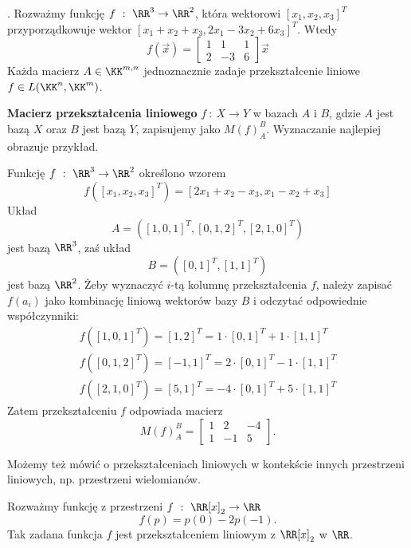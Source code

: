 . Rozważmy funkcję $f \ : \ \RR^3 \to \RR^2$, która wektorowi $[x_1,x_2,x_3]^T$ przyporządkowuje wektor $[x_1+x_2+x_3,2x_1-3x_2+6x_3]^T$. Wtedy
$$
f(\vec{x})=\begin{bmatrix}
    1 & 1 & 1 \\
    2 & -3 & 6
\end{bmatrix}\vec{x}
$$
Każda macierz $A\in\KK^{m,n}$ jednoznacznie zadaje przekształcenie liniowe $f\in L(\KK^n, \KK^m)$.
\bigskip

\textbf{Macierz przekształcenia liniowego} $f \ : \ X \to Y$ w bazach $A$ i $B$, gdzie $A$ jest bazą $X$ oraz $B$ jest bazą $Y$, zapisujemy jako $M(f)_A^B$. Wyznaczanie najlepiej obrazuje przykład.

\begin{example}
    Funkcję $f \ : \ \RR^3 \to \RR^2$ określono wzorem
    $$
    f([x_1,x_2,x_3]^T)=[2x_1+x_2-x_3, x_1-x_2+x_3]
    $$
    Układ
    $$
    A=\left( [1,0,1]^T, [0,1,2]^T, [2,1,0]^T \right)
    $$
    jest bazą $\RR^3$, zaś układ
    $$
    B = \left( [0,1]^T, [1,1]^T \right)
    $$
    jest bazą $\RR^2$. Żeby wyznaczyć $i$-tą kolumnę przekształcenia $f$, należy zapisać $f(a_i)$ jako kombinację liniową wektorów bazy $B$ i odczytać odpowiednie współczynniki:
    $$
    \begin{matrix}
        f([1,0,1]^T) = [1,2]^T = 1\cdot[0,1]^T + 1\cdot[1,1]^T  \\
        f([0,1,2]^T) = [-1,1]^T = 2\cdot[0,1]^T -1\cdot[1,1]^T \\
        f([2,1,0]^T) = [5,1]^T = -4\cdot[0,1]^T + 5\cdot[1,1]^T
    \end{matrix}
    $$
    Zatem przekształceniu $f$ odpowiada macierz
    $$
    M(f)_A^B=\begin{bmatrix}
        1 & 2 & -4 \\ 1 & -1 & 5
    \end{bmatrix}.
    $$
\end{example}
Możemy też mówić o przekształceniach liniowych w kontekście innych przestrzeni liniowych, np. przestrzeni wielomianów. 
\begin{example}
Rozważmy funkcję z przestrzeni $f \ : \ \RR[x]_2 \to \RR$
$$
f(p)=p(0)-2p(-1).
$$
Tak zadana funkcja $f$ jest przekształceniem liniowym z $\RR[x]_2$ w $\RR$. 
\end{example}

